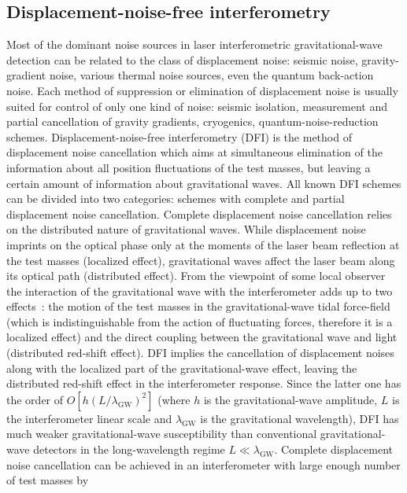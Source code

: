 \subsection{Displacement-noise-free interferometry}\label{app:DFI}
Most of the dominant noise sources in laser
interferometric gravitational-wave detection can be related to the
class of displacement noise: seismic noise, gravity-gradient
noise, various thermal noise sources, even the quantum back-action
noise. Each method of suppression or elimination of displacement
noise is usually suited for control of only one kind of noise:
seismic isolation, measurement and partial cancellation of gravity
gradients, cryogenics, quantum-noise-reduction schemes.
Displacement-noise-free interferometry (DFI) is the method of
displacement noise cancellation which aims at simultaneous
elimination of the information about all position fluctuations of
the test masses, but leaving a certain amount of information about
gravitational waves. All known DFI schemes can be divided into two
categories: schemes with complete and partial displacement noise
cancellation. Complete displacement noise cancellation relies on
the distributed nature of gravitational waves. While displacement
noise imprints on the optical phase only at the moments of the
laser beam reflection at the test masses (localized effect),
gravitational waves affect the laser beam along its optical path
(distributed effect). From the viewpoint of some local observer
the interaction of the gravitational wave with the interferometer
adds up to two effects~\cite{2005_local_observ}: the motion of the
test masses in the gravitational-wave tidal force-field (which is
indistinguishable from the action of fluctuating forces, therefore
it is a localized effect) and the direct coupling between the
gravitational wave and light (distributed red-shift effect). DFI
implies the cancellation of displacement noises along with the
localized part of the gravitational-wave effect, leaving the
distributed red-shift effect in the interferometer response. Since
the latter one has the order of $O[h(L/\lambda_{\textrm{GW}})^2]$
(where $h$ is the gravitational-wave amplitude, $L$ is the
interferometer linear scale and $\lambda_{\textrm{GW}}$ is the
gravitational wavelength), DFI has much weaker gravitational-wave
susceptibility than conventional gravitational-wave detectors in
the long-wavelength regime $L\ll\lambda_{\textrm{GW}}$. Complete
displacement noise cancellation can be achieved in an
interferometer with large enough number of test masses by
